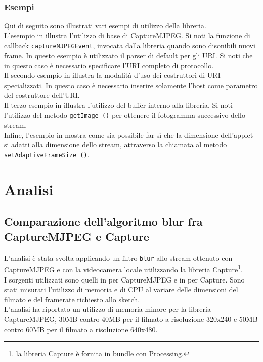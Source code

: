 \documentclass[a4paper,11pt]{article}
\begin{document}
\subsubsection{Esempi}
\label{sec:utilizzo_esempi}
Qui di seguito sono illustrati vari esempi di utilizzo della libreria.\\

L'esempio in  illustra l'utilizzo di base di CaptureMJPEG.
Si noti la funzione di callback \texttt{captureMJPEGEvent}, invocata dalla libreria quando
sono disonibili nuovi frame. In questo esempio \`e utilizzato il parser di
default per gli URI. Si noti che in questo caso \`e necessario specificare
l'URI completo di protocollo.\\

Il secondo esempio in  illustra la modalit\`a
d'uso dei costruttori di URI specializzati. In questo caso \`e necessario
inserire solamente l'host come parametro del costruttore dell'URI.\\

Il terzo esempio in  illustra l'utilizzo del buffer
interno alla libreria. Si noti l'utilizzo del metodo \texttt{getImage ()} per
ottenere il fotogramma successivo dello stream.\\

Infine, l'esempio in  mostra come sia possibile
far s\`i che la dimensione dell'applet si adatti alla dimensione dello stream,
attraverso la chiamata al metodo \texttt{setAdaptiveFrameSize ()}.\\

\section{Analisi}
\label{sec:analisi}

\subsection{Comparazione dell'algoritmo blur fra CaptureMJPEG e Capture}
\label{sec:comparazione}

L'analisi è stata svolta applicando un filtro \texttt{blur} allo
stream ottenuto con CaptureMJPEG e con la videocamera locale
utilizzando la libreria Capture\footnote{la libreria Capture è fornita
  in bundle con Processing.}.\\
I sorgenti utilizzati sono quelli in  per
CaptureMJPEG e in  per Capture.
Sono stati misurati l'utilizzo di memoria e di CPU al variare delle
dimensioni del filmato e del framerate richiesto allo sketch.\\
L'analisi ha riportato un utilizzo di memoria minore per la libreria
CaptureMJPEG, 30MB contro 40MB per il filmato a risoluzione 320x240 e
50MB contro 60MB per il filmato a risoluzione 640x480.\\
\end{document}
